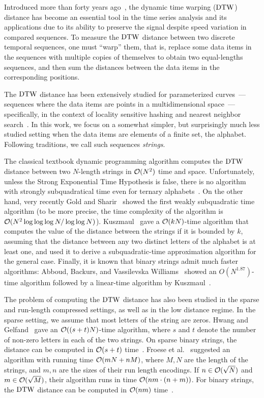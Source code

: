 Introduced more than forty years ago~\cite{sakoe1978dynamic}, the dynamic time warping ($\mathrm{DTW}$) distance has become an essential tool in the time series analysis and its applications due to its ability to preserve the signal despite speed variation in compared sequences. To measure the $\mathrm{DTW}$ distance between two discrete temporal sequences, one must ``warp'' them, that is, replace some data items in the sequences with multiple copies of themselves to obtain two equal-lengths sequences, and then sum the distances between the data items in the corresponding positions. 

The $\mathrm{DTW}$ distance has been extensively studied for parameterized curves~--- sequences where the data items are points in a multidimensional space~---  specifically, in the context of locality sensitive hashing and nearest neighbor search~\cite{LSH,ANN}. In this work, we focus on a somewhat simpler, but surprisingly much less studied setting when the data items are elements of a finite set, the alphabet. Following traditions, we call such sequences \emph{strings}. 

The classical textbook dynamic programming algorithm computes the $\mathrm{DTW}$ distance between two $N$-length strings in $\mathcal{O}(N^2)$ time and space. Unfortunately, unless the Strong Exponential Time Hypothesis is false, there is no algorithm with strongly subquadratical time even for ternary alphabets~\cite{DBLP:conf/focs/AbboudBW15,7354389,DBLP:conf/icalp/Kuszmaul19}. On the other hand, very recently Gold and Sharir~\cite{DBLP:journals/talg/GoldS18} showed the first weakly subquadratic time algorithm (to be more precise, the time complexity of the algorithm is~$\mathcal{O}(N^2 \log \log  \log N / \log \log N)$). Kuszmaul~\cite{DBLP:conf/icalp/Kuszmaul19} gave a $\mathcal{O}(kN)$-time algorithm that computes the value of the distance between the strings if it is bounded by $k$, assuming that the distance between any two distinct letters of the alphabet is at least one, and used it to derive a subquadratic-time approximation algorithm for the general case. Finally, it is known that binary strings admit much faster algorithms: Abboud, Backurs, and Vassilevska Williams~\cite{DBLP:conf/focs/AbboudBW15} showed an $O(N^{1.87})$-time algorithm followed by a linear-time algorithm by Kuszmaul~\cite{DBLP:journals/corr/abs-2101-01108}. 

The problem of computing the $\mathrm{DTW}$ distance has also been studied in the sparse and run-length compressed settings, as well as in the low distance regime.  
In the sparse setting, we assume that most letters of the string are zeros. Hwang and Gelfand~\cite{hwang2017sparse} gave an $\mathcal{O}((s+t) N)$-time algorithm, where $s$ and $t$ denote the number of non-zero letters in each of the two strings. On sparse binary strings, the distance can be computed in $\mathcal{O}(s+t)$ time~\cite{DBLP:conf/mldm/HwangG19,mueen2016awarp}. Froese et al.~\cite{DBLP:journals/corr/abs-1903-03003} suggested an algorithm with running time $\mathcal{O}(mN+nM)$, where $M,N$ are the length of the strings, and $m, n$ are the sizes of their run length encodings. If $n \in \mathcal{O}(\sqrt{N})$ and $m \in \mathcal{O}(\sqrt{M})$, their algorithm runs in time $\mathcal{O}(nm \cdot (n+m))$. For binary strings, the $\mathrm{DTW}$ distance can be computed in $\mathcal{O}(nm)$ time~\cite{DBLP:conf/pkdd/DupontM15a}. 

